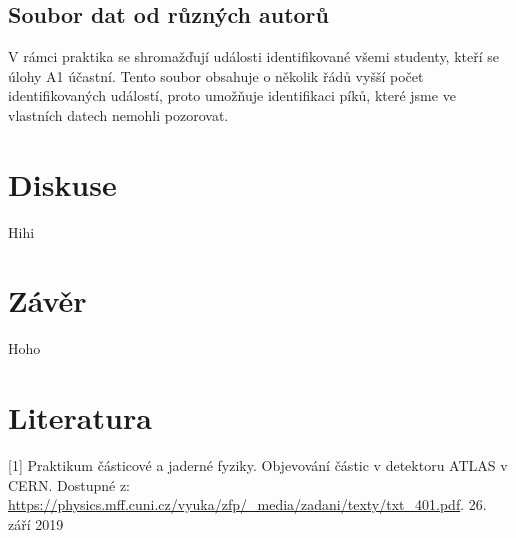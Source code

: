 \documentclass[10pt,a4paper]{article}
\newcommand{\°}{\degree}
\begin{document}
\subsection{Soubor dat od různých autorů}
V rámci praktika se shromažďují události identifikované všemi studenty, kteří se úlohy A1 účastní. Tento soubor obsahuje o několik řádů vyšší počet identifikovaných událostí, proto umožňuje identifikaci píků, které jsme ve vlastních datech nemohli pozorovat.


\section{Diskuse}
Hihi

\section{Závěr}
Hoho


\section{Literatura}
[1] Praktikum částicové a jaderné fyziky. Objevování částic v detektoru ATLAS v CERN. Dostupné z: \url{https://physics.mff.cuni.cz/vyuka/zfp/_media/zadani/texty/txt_401.pdf}. 26. září 2019
\end{document}
